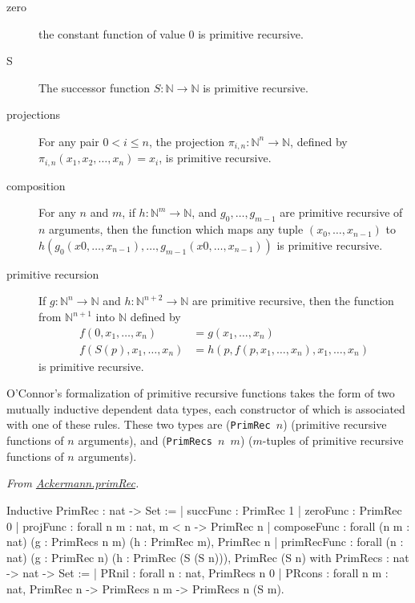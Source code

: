 \begin{description}
  \item[zero] the constant function of value $0$ is primitive recursive.
\item[S] The successor function $S:\mathbb{N}\rightarrow\mathbb{N}$ is primitive recursive.
 \item[projections] For any pair $0< i\leq n$, the projection $\pi_{i,n}: \mathbb{N}^n\rightarrow\mathbb{N}$, defined by $\pi_{i,n}(x_1,x_2,\dots,x_{n})=x_i$, is primitive recursive.
\item[composition] For any $n$ and $m$, if $h: \mathbb{N}^m\rightarrow\mathbb{N}$, and
$g_0,\dots, g_{m-1}$ are primitive recursive of $n$ arguments, then the function which maps any
tuple $(x_0,\dots,x_{n-1})$ to $h(g_0(x0,\dots,x_{n-1}),\dots, g_{m-1}(x0,\dots,x_{n-1}))$ is primitive recursive.
\item[primitive recursion]
If $g: \mathbb{N}^n\rightarrow\mathbb{N}$ and $h: \mathbb{N}^{n+2}\rightarrow\mathbb{N}$ are primitive recursive, then the function from $\mathbb{N}^{n+1}$ into $\mathbb{N}$ defined by
\begin{align}
f(0,x_1,\dots,x_n)&=g(x_1,\dots,x_n)\\
f(S(p),x_1,\dots,x_n)&=h(p,f(p, x_1,\dots,x_n),  x_1,\dots,x_n)
\end{align} 
is primitive recursive.
\end{description}

O'Connor's formalization of primitive recursive functions takes the form of two mutually inductive dependent data types, each constructor of which is associated with one of these  rules.
These two types are (\texttt{PrimRec $n$}) (primitive recursive functions of $n$ arguments), and
(\texttt{PrimRecs $n$ $m$}) ($m$-tuples of primitive recursive functions of $n$ arguments).


\vspace{4pt}
\noindent
\emph{From \href{../theories/html/hydras.Ackermann.primRec.html}{Ackermann.primRec}.}
\begin{Coqsrc}
Inductive PrimRec : nat -> Set :=
  | succFunc : PrimRec 1
  | zeroFunc : PrimRec 0
  | projFunc : forall n m : nat, m < n -> PrimRec n
  | composeFunc :
      forall (n m : nat) (g : PrimRecs n m) (h : PrimRec m), PrimRec n
  | primRecFunc :
      forall (n : nat) (g : PrimRec n) (h : PrimRec (S (S n))), 
      PrimRec (S n)
with PrimRecs : nat -> nat -> Set :=
  | PRnil : forall n : nat, PrimRecs n 0
  | PRcons : forall n m : nat, PrimRec n -> PrimRecs n m -> 
                   PrimRecs n (S m).
\end{Coqsrc}

